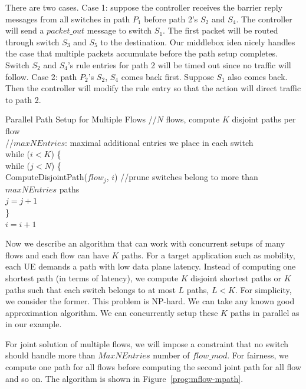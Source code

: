 There are two cases. Case 1: suppose the controller
receives the barrier reply messages from all switches in path $P_1$ before path
2's $S_2$ and $S_4$. The controller will send a $packet\_out$ message to switch $S_1$. 
The first packet will be routed
through switch $S_3$ and $S_5$ to the destination. Our middlebox idea nicely
handles the case that multiple packets accumulate before the path setup
completes. Switch $S_2$ and $S_4$'s rule entries for path 2 will be timed out
since no traffic will follow. Case 2: path $P_2$'s $S_2$, $S_4$ comes back
first. Suppose $S_1$ also comes back. Then the controller will modify the rule
entry so that the action will direct traffic to path 2.   

    {Parallel Path Setup for Multiple Flows}
{
//$N$ flows, compute $K$ disjoint paths per flow \\
//$maxNEntries$: maximal additional entries we place in each switch \\
while ($i<K$) \{ \\
\> while ($j<N$) \{ \\
\>\>ComputeDisjointPath($flow_j$, $i$) //prune switches belong to more than \\
\>\>\> $maxNEntries$ paths \\
\>\>    $j = j+1$ \\
\> \} \\    
\> $i=i+1$ \\
}

Now we describe an algorithm that can work with concurrent setups of many
flows and each flow can have $K$ paths. For a target application such as
mobility, each UE demands a path with low data plane latency. Instead of
computing one shortest path (in terms of latency), we compute $K$ disjoint
shortest paths or $K$ paths such that each switch belongs to at most $L$ paths,
$L<K$. For simplicity, we consider the former. This problem is NP-hard. We can
take any known good approximation algorithm. We can concurrently setup these
$K$ paths in parallel as in our example. 

For joint solution of multiple flows, we will impose a constraint that no
switch should handle more than $MaxNEntries$ number of $flow\_mod$.  For
fairness, we compute one path for all flows before computing the second
joint path for all flow and so on.  The algorithm is shown in
Figure~\ref{prog:mflow-mpath}. 

